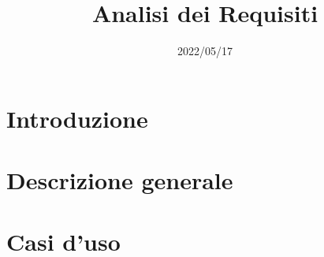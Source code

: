 \documentclass{classes/base}
\title{Analisi dei Requisiti}
\date{2022/05/17}
\author{\giulio}
\begin{document}
	\maketitle
	\newpage
	
	\newpage
	\tableofcontents

	\newpage
	\section{Introduzione}
	

	\newpage
	\section{Descrizione generale}
	

	\newpage
	\section{Casi d'uso}
	

\end{document}

